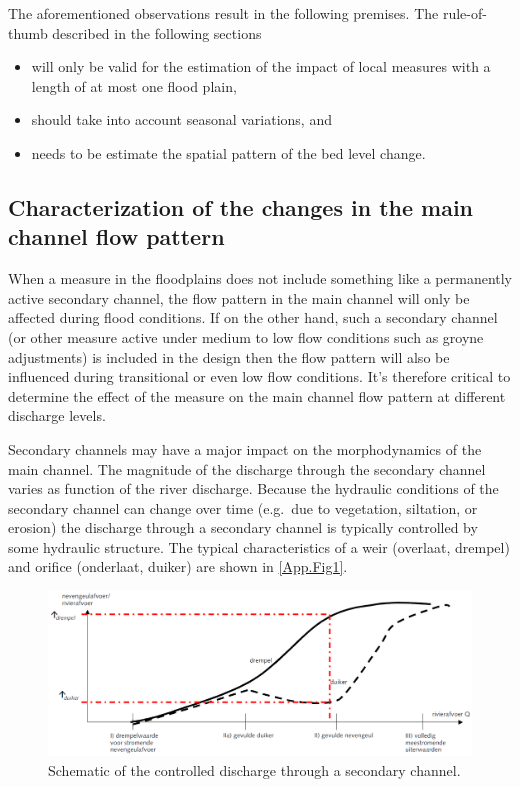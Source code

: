 The aforementioned observations result in the following premises.
The rule-of-thumb described in the following sections

\begin{itemize}
\item will only be valid for the estimation of the impact of local measures with a length of at most one flood plain,

\item should take into account seasonal variations, and

\item needs to be estimate the spatial pattern of the bed level change.
\end{itemize}


\subsection{Characterization of the changes in the main channel flow pattern}

When a measure in the floodplains does not include something like a permanently active secondary channel, the flow pattern in the main channel will only be affected during flood conditions.
If on the other hand, such a secondary channel (or other measure active under medium to low flow conditions such as groyne adjustments) is included in the design then the flow pattern will also be influenced during transitional or even low flow conditions.
It's therefore critical to determine the effect of the measure on the main channel flow pattern at different discharge levels.

Secondary channels may have a major impact on the morphodynamics of the main channel.
The magnitude of the discharge through the secondary channel varies as function of the river discharge.
Because the hydraulic conditions of the secondary channel can change over time (e.g.~due to vegetation, siltation, or erosion) the discharge through a secondary channel is typically controlled by some hydraulic structure.
The typical characteristics of a weir (overlaat, drempel) and orifice (onderlaat, duiker) are shown in \autoref{App.Fig1}.

\begin{figure}
\includegraphics[width=\columnwidth]{figures/Fig1.png}
\caption{Schematic of the controlled discharge through a secondary channel.}
\label{App.Fig1}
\end{figure}

